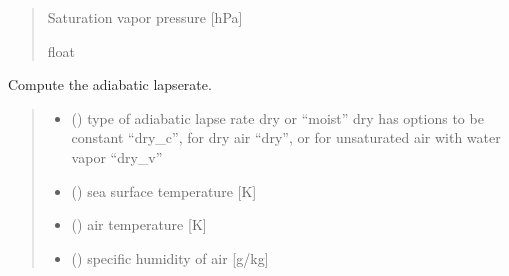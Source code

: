 \documentclass[letterpaper,10pt,english]{sphinxmanual}
\begin{document}
\begin{fulllineitems}
\begin{quote}
\begin{description}
\begin{itemize}
\end{itemize}

\sphinxAtStartPar
{} \textendash{} Saturation vapor pressure {[}hPa{]}

\sphinxAtStartPar
float

\end{description}\end{quote}

\end{fulllineitems}


\begin{fulllineitems}
\label{\detokenize{users_guide:hum_subs.gamma}}
\pysigstartsignatures
{}
\pysigstopsignatures
\sphinxAtStartPar
Compute the adiabatic lapse\sphinxhyphen{}rate.
\begin{quote}\begin{description}
\begin{itemize}
\item {} 
\sphinxAtStartPar
{} () \textendash{} type of adiabatic lapse rate dry or “moist”
dry has options to be constant “dry\_c”, for dry air “dry”, or
for unsaturated air with water vapor “dry\_v”

\item {} 
\sphinxAtStartPar
{} () \textendash{} sea surface temperature {[}K{]}

\item {} 
\sphinxAtStartPar
{} () \textendash{} air temperature {[}K{]}

\item {} 
\sphinxAtStartPar
{} () \textendash{} specific humidity of air {[}g/kg{]}


\end{itemize}
\end{description}
\end{quote}
\end{fulllineitems}
\end{document}
